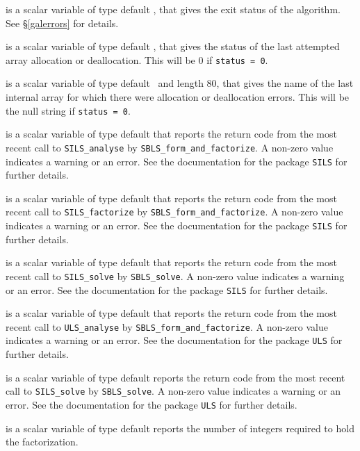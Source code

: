 \documentclass{galahad}
\newcommand{\packagename}{SBLS}
\begin{document}
\begin{description}

 is a scalar variable of type default \integer, that gives the
exit status of the algorithm.
See \S\ref{galerrors}
for details.

 is a scalar variable of type default \integer, that gives
the status of the last attempted array allocation or deallocation.
This will be 0 if {\tt status = 0}.

 is a scalar variable of type default \character\
and length 80, that  gives the name of the last internal array
for which there were allocation or deallocation errors.
This will be the null string if {\tt status = 0}.

 is a scalar variable of type default \integer
that reports the return code from the most recent call to {\tt SILS\_analyse}
by {\tt \packagename\_form\_and\_factorize}. A non-zero value indicates
a warning or an error. See the documentation for the package {\tt SILS}
for further details.

 is a scalar variable of type default \integer
that reports the return code from the most recent call to {\tt SILS\_factorize}
by {\tt \packagename\_form\_and\_factorize}. A non-zero value indicates
a warning or an error. See the documentation for the package {\tt SILS}
for further details.

 is a scalar variable of type default \integer
that reports the return code from the most recent call to {\tt SILS\_solve}
by {\tt \packagename\_solve}. A non-zero value indicates
a warning or an error. See the documentation for the package {\tt SILS}
for further details.

 is a scalar variable of type default \integer
that reports the return code from the most recent call to {\tt ULS\_analyse}
by {\tt \packagename\_form\_and\_factorize}. A non-zero value indicates
a warning or an error. See the documentation for the package {\tt ULS}
for further details.

 is a scalar variable of type default \integer
reports the return code from the most recent call to {\tt SILS\_solve}
by {\tt \packagename\_solve}. A non-zero value indicates
a warning or an error. See the documentation for the package {\tt ULS}
for further details.

 is a scalar variable of type default \integer
reports the number of integers required to hold the factorization.


\end{description}
\end{document}

